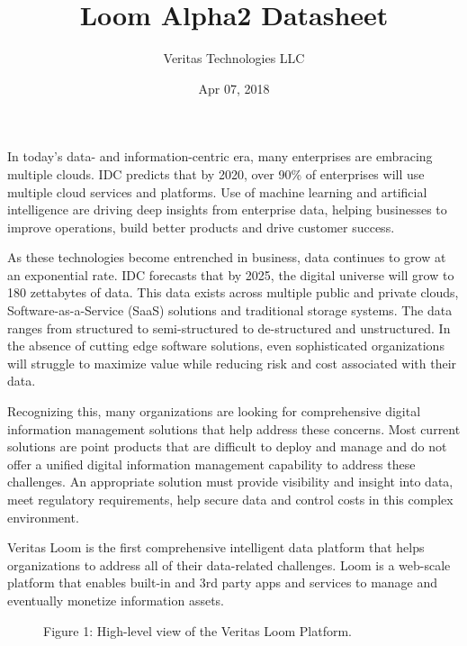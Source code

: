 \documentclass[letterpaper,10pt,english]{sphinxhowto}
\title{Loom Alpha2 Datasheet}
\date{Apr 07, 2018}
\author{Veritas Technologies LLC}
\begin{document}
\maketitle
\sphinxtableofcontents
{}\label{\detokenize{col/ds/mcdmp_ds_alpha2::doc}}



In today’s data- and information-centric era, many enterprises are embracing multiple clouds. IDC predicts that by 2020, over 90\% of enterprises will use multiple cloud services and platforms. Use of machine learning and artificial intelligence are driving deep insights from enterprise data, helping businesses to improve operations, build better products and drive customer success.

As these technologies become entrenched in business, data continues to grow at an exponential rate. IDC forecasts that by 2025, the digital universe will grow to 180 zettabytes of data. This data exists across multiple public and private clouds, Software-as-a-Service (SaaS) solutions and traditional storage systems. The data ranges from structured to semi-structured to de-structured and unstructured. In the absence of cutting edge software solutions, even sophisticated organizations will struggle to maximize value while reducing risk and cost associated with their data.

Recognizing this, many organizations are looking for comprehensive digital information management solutions that help address these concerns. Most current solutions are point products that are difficult to deploy and manage and do not offer a unified digital information management capability to address these challenges. An appropriate solution must provide visibility and insight into data, meet regulatory requirements, help secure data and control costs in this complex environment.

Veritas Loom is the first comprehensive intelligent data platform that helps organizations to address all of their data-related challenges. Loom is a web-scale platform that enables built-in and 3rd party apps and services to manage and eventually monetize information assets.

\begin{figure}[htbp]
\centering
\capstart

\noindent{}
\caption{Figure 1: High-level view of the Veritas Loom Platform.}\label{\detokenize{col/ds/mcdmp_ds_alpha2:id1}}\end{figure}
\end{document}
